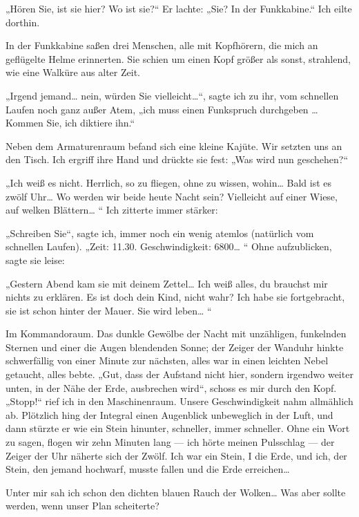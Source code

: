 „Hören Sie, ist sie hier? Wo ist sie?“ Er lachte: „Sie? In der
Funkkabine.“ Ich eilte dorthin.

In der Funkkabine saßen drei Menschen, alle mit Kopfhörern, die
mich an geflügelte Helme erinnerten. Sie schien um einen Kopf
größer als sonst, strahlend, wie eine Walküre aus alter Zeit.

„Irgend jemand\ldots{} nein, würden Sie vielleicht\ldots{}“, sagte ich zu
ihr, vom schnellen Laufen noch ganz außer Atem, „ich muss einen
Funkspruch durchgeben \ldots{} Kommen Sie, ich diktiere ihn.“

Neben dem Armaturenraum befand sich eine kleine Kajüte. Wir setzten
uns an den Tisch. Ich ergriff ihre Hand und drückte sie fest: „Was
wird nun geschehen?“

„Ich weiß es nicht. Herrlich, so zu fliegen, ohne zu wissen,
wohin\ldots{} Bald ist es zwölf Uhr\ldots{} Wo werden wir beide heute Nacht
sein? Vielleicht auf einer Wiese, auf welken Blättern\ldots{} “ Ich
zitterte immer stärker:

„Schreiben Sie“, sagte ich, immer noch ein wenig atemlos (natürlich
vom schnellen Laufen). „Zeit: 11.30. Geschwindigkeit: 6800\ldots{} “
Ohne aufzublicken, sagte sie leise:

„Gestern Abend kam sie mit deinem Zettel\ldots{} Ich weiß alles, du
brauchst mir nichts zu erklären. Es ist doch dein Kind, nicht wahr?
Ich habe sie fortgebracht, sie ist schon hinter der Mauer. Sie wird
leben\ldots{} “

Im Kommandoraum. Das dunkle Gewölbe der Nacht mit unzähligen,
funkelnden Sternen und einer die Augen blendenden Sonne; der Zeiger
der Wanduhr hinkte schwerfällig von einer Minute zur nächsten,
alles war in einen leichten Nebel getaucht, alles bebte. „Gut, dass
der Aufstand nicht hier, sondern irgendwo weiter unten, in der Nähe
der Erde, ausbrechen wird“, schoss es mir durch den Kopf. „Stopp!“
rief ich in den Maschinenraum. Unsere Geschwindigkeit nahm
allmählich ab. Plötzlich hing der Integral einen Augenblick
unbeweglich in der Luft, und dann stürzte er wie ein Stein
hinunter, schneller, immer schneller. Ohne ein Wort zu sagen,
flogen wir zehn Minuten lang — ich hörte meinen Pulsschlag — der
Zeiger der Uhr näherte sich der Zwölf. Ich war ein Stein, I die
Erde, und ich, der Stein, den jemand hochwarf, musste fallen und
die Erde erreichen\ldots{}

Unter mir sah ich schon den dichten blauen Rauch der Wolken\ldots{} Was
aber sollte werden, wenn unser Plan scheiterte?


